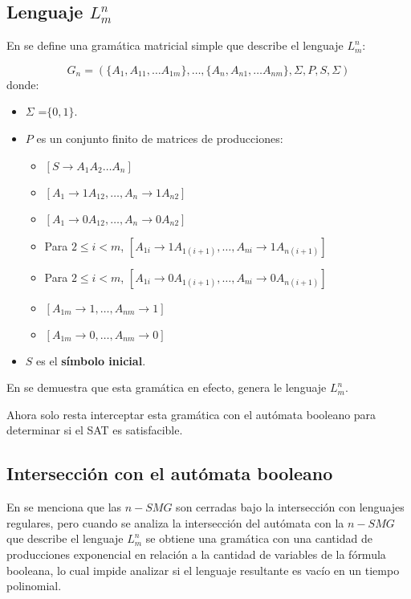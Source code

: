 \documentclass[12pt]{article}
\begin{document}
\subsection{Lenguaje $L^n_m$}

En \cite{aSMSAT} se define una gramática matricial simple que describe el lenguaje $L^n_m$:

$$
      G_n=(\{A_1,A_{11},\ldots A_{1m}\},\ldots,\{A_n,A_{n1},\ldots A_{nm}\},\Sigma,P,S,\Sigma)
$$
donde:
\begin{itemize}
      \item \( \Sigma \) =$\{0,1\}$.
      \item \( P \) es un conjunto finito de matrices de producciones:
            \begin{itemize}
                  \item  $[S \to A_1A_2\ldots A_n]$
                  \item  $[A_1 \to 1A_{12}, \ldots, A_n \to 1A_{n2}]$
                  \item  $[A_1 \to 0A_{12}, \ldots, A_n \to 0A_{n2}]$
                  \item  Para $2 \leq i < m$, $[A_{1i} \to 1A_{1(i+1)}, \ldots, A_{ni} \to 1A_{n(i + 1)}]$
                  \item  Para $2 \leq i < m$, $[A_{1i} \to 0A_{1(i+1)}, \ldots, A_{ni} \to 0A_{n(i + 1)}]$
                  \item  $[A_{1m} \to 1, \ldots, A_{nm} \to 1]$
                  \item  $[A_{1m} \to 0, \ldots, A_{nm} \to 0]$
            \end{itemize}
      \item \( S \) es el \textbf{símbolo inicial}.
\end{itemize}

En \cite{simpleMatrixLanguages} se demuestra que esta gramática en efecto, genera le lenguaje $L^n_m$.

Ahora solo resta interceptar esta gramática con el autómata booleano para determinar si el SAT es satisfacible.

\subsection{Intersección con el autómata booleano}

En \cite{aSMSAT} se menciona que las $n-SMG$ son cerradas bajo la intersección con lenguajes regulares, 
pero cuando se analiza la intersección del autómata con la $n-SMG$ que describe el lenguaje $L^n_m$ se 
obtiene una gramática con una cantidad de producciones exponencial en relación a la cantidad de variables 
de la fórmula booleana, lo cual impide analizar si el lenguaje resultante es vacío en un tiempo polinomial.
\end{document}
